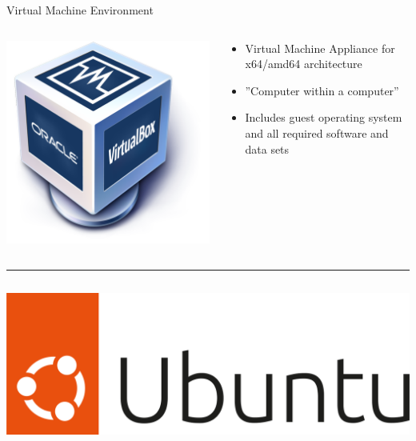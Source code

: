 \documentclass[ignorenonframetext,xcolor=dvipsnames]{beamer}
\begin{document}
\begin{frame}{Virtual Machine Environment}

\begin{columns}
\begin{column}{.25\textwidth}
\includegraphics[width=\columnwidth]{Virtualbox_logo.png}
\end{column}
\begin{column}{.75\textwidth}
\begin{itemize}
  \item Virtual Machine Appliance for x64/amd64 architecture
  \item ''Computer within a computer''
  \item Includes guest operating system and all required software and data sets
\end{itemize}
\end{column}
\end{columns}
\vspace{4mm} \rule{\textwidth}{1pt} \vspace{2mm}
\begin{columns}
\begin{column}{.25\textwidth}
\includegraphics[width=\columnwidth]{Ubuntu-logo.png} 

\end{column}
\end{columns}
\end{frame}
\end{document}
